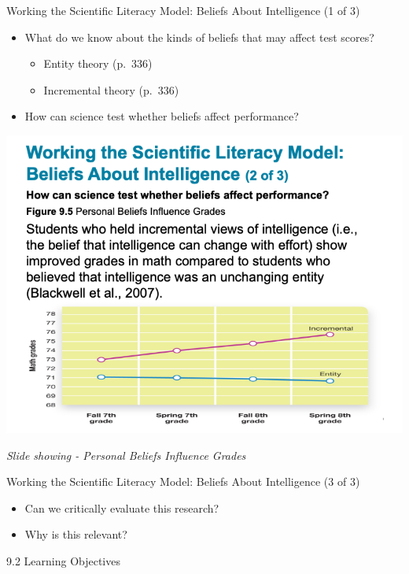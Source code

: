 \documentclass[
]{book}
\providecommand{\tightlist}{%
  \setlength{\itemsep}{0pt}\setlength{\parskip}{0pt}}
\begin{document}
\begin{reflect}
Working the Scientific Literacy Model: Beliefs About Intelligence (1 of 3)

\begin{itemize}
\tightlist
\item
  What do we know about the kinds of beliefs that may affect test scores?

  \begin{itemize}
  \tightlist
  \item
    Entity theory (p.~336)\\
  \item
    Incremental theory (p.~336)\\
  \end{itemize}
\item
  How can science test whether beliefs affect performance?
\end{itemize}

\includegraphics{assets/unit_2/slide_19.png}

\emph{Slide showing - Personal Beliefs Influence Grades}

Working the Scientific Literacy Model: Beliefs About Intelligence (3 of 3)

\begin{itemize}
\tightlist
\item
  Can we critically evaluate this research?\\
\item
  Why is this relevant?
\end{itemize}

9.2 Learning Objectives


\end{reflect}
\end{document}
